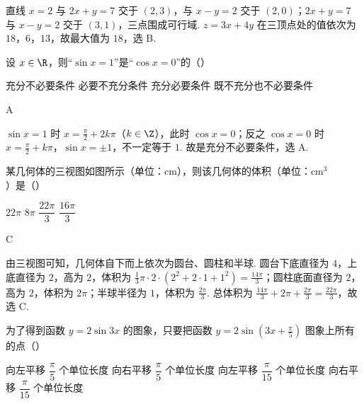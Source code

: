 \begin{solution}
直线 \(x=2\) 与 \(2x+y=7\) 交于 \((2,3)\)，与 \(x-y=2\) 交于 \((2,0)\)；\(2x+y=7\) 与 \(x-y=2\) 交于 \((3,1)\)，三点围成可行域. \(z=3x+4y\) 在三顶点处的值依次为 \(18\)，\(6\)，\(13\)，故最大值为 \(18\)，选 B.
\end{solution}

\begin{problem}
设 \(x\in\R\)，则“\(\sin x=1\)”是“\(\cos x=0\)”的（\quad）

\choices
    {充分不必要条件}
    {必要不充分条件}
    {充分必要条件}
    {既不充分也不必要条件}
\end{problem}

\begin{answer}
A
\end{answer}

\begin{solution}
\(\sin x=1\) 时 \(x=\frac\pi2+2k\pi\)（\(k\in\Z\)），此时 \(\cos x=0\)；反之 \(\cos x=0\) 时 \(x=\frac\pi2+k\pi\)，\(\sin x=\pm1\)，不一定等于 \(1\). 故是充分不必要条件，选 A.
\end{solution}

\begin{problem}
某几何体的三视图如图所示（单位：\(\mathrm{cm}\)），则该几何体的体积（单位：\(\mathrm{cm}^3\)）是（\quad）


\choices
    {\(22\pi\)}
    {\(8\pi\)}
    {\(\dfrac{22\pi}{3}\)}
    {\(\dfrac{16\pi}{3}\)}
\end{problem}

\begin{answer}
C
\end{answer}

\begin{solution}
由三视图可知，几何体自下而上依次为圆台、圆柱和半球. 圆台下底直径为 \(4\)，上底直径为 \(2\)，高为 \(2\)，体积为 \(\frac13\pi\cdot2\cdot(2^2+2\cdot1+1^2)=\frac{14\pi}3\)；圆柱底面直径为 \(2\)，高为 \(2\)，体积为 \(2\pi\)；半球半径为 \(1\)，体积为 \(\frac{2\pi}3\). 总体积为 \(\frac{14\pi}3+2\pi+\frac{2\pi}3=\frac{22\pi}3\)，故选 C.
\end{solution}

\begin{problem}
为了得到函数 \(y=2\sin 3x\) 的图象，只要把函数 \(y=2\sin\left(3x+\frac{\pi}{5}\right)\) 图象上所有的点（\quad）

\choices
    {向左平移 \(\dfrac{\pi}{5}\) 个单位长度}
    {向右平移 \(\dfrac{\pi}{5}\) 个单位长度}
    {向左平移 \(\dfrac{\pi}{15}\) 个单位长度}
    {向右平移 \(\dfrac{\pi}{15}\) 个单位长度}
\end{problem}

